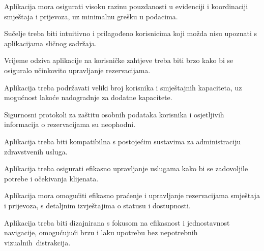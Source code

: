 			\begin{packed_item}
				\setlength\itemsep{10pt}
				\item Aplikacija mora osigurati visoku razinu pouzdanosti u evidenciji i koordinaciji smještaja i prijevoza, uz minimalnu grešku u podacima.
				\item Sučelje treba biti intuitivno i prilagođeno korisnicima koji možda nisu upoznati s aplikacijama sličnog sadržaja.
				\item Vrijeme odziva aplikacije na korisničke zahtjeve treba biti brzo kako bi se osiguralo učinkovito upravljanje rezervacijama.
				\item Aplikacija treba podržavati veliki broj korisnika i smještajnih kapaciteta, uz mogućnost lakoće nadogradnje za dodatne kapacitete.
				\item Sigurnosni protokoli za zaštitu osobnih podataka korisnika i osjetljivih informacija o rezervacijama su neophodni.
				\item Aplikacija treba biti kompatibilna s postojećim sustavima za administraciju zdravstvenih usluga.
				\item Aplikacija treba osigurati efikasno upravljanje uslugama kako bi se zadovoljile potrebe i očekivanja klijenata.
				\item Aplikacija mora omogućiti efikasno praćenje i upravljanje rezervacijama smještaja i prijevoza, s detaljnim izvještajima o statusu i dostupnosti.
				\item Aplikacija treba biti dizajnirana s fokusom na efikasnost i jednostavnost navigacije, omogućujući brzu i laku upotrebu bez nepotrebnih vizualnih distrakcija.
			\end{packed_item}
			 
			 
			 
	
